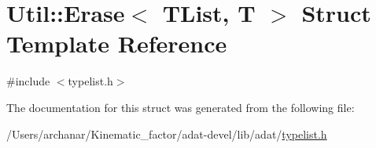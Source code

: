 \hypertarget{structUtil_1_1TL_1_1Erase}{}\section{Util\+:\+:Erase$<$ T\+List, T $>$ Struct Template Reference}
\label{structUtil_1_1TL_1_1Erase}


{\ttfamily \#include $<$typelist.\+h$>$}



The documentation for this struct was generated from the following file\+:\begin{DoxyCompactItemize}
\item 
/\+Users/archanar/\+Kinematic\+\_\+factor/adat-\/devel/lib/adat/\mbox{\hyperlink{adat-devel_2lib_2adat_2typelist_8h}{typelist.\+h}}\end{DoxyCompactItemize}
